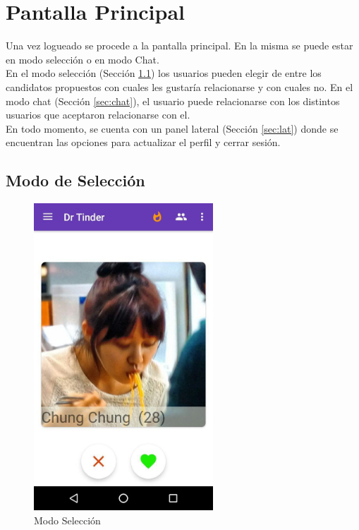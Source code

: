 \documentclass[10pt,letterpaper,extrafontsizes]{memoir}
\begin{document}
\chapter{Pantalla Principal}

Una vez logueado se procede a la pantalla principal. En la misma se puede estar en modo selección o en modo Chat.\\
En el modo selección (Sección \ref{sec:selección}) los usuarios pueden elegir de entre los candidatos propuestos con cuales les gustaría relacionarse y con cuales no. En el modo chat (Sección \ref{sec:chat}), el usuario puede relacionarse con los distintos usuarios que aceptaron relacionarse con el.\\
En todo momento, se cuenta con un panel lateral (Sección \ref{sec:lat}) donde se encuentran las opciones para actualizar el perfil y cerrar sesión.

\newpage
\section{Modo de Selección} \label{sec:selección}

\begin{figure}[H]
    \centering
\includegraphics[width=0.6\textwidth]{graficos/capturas/l}
    \caption{Modo Selección}
    \label{fig:pselec}
\end{figure}
\end{document}
